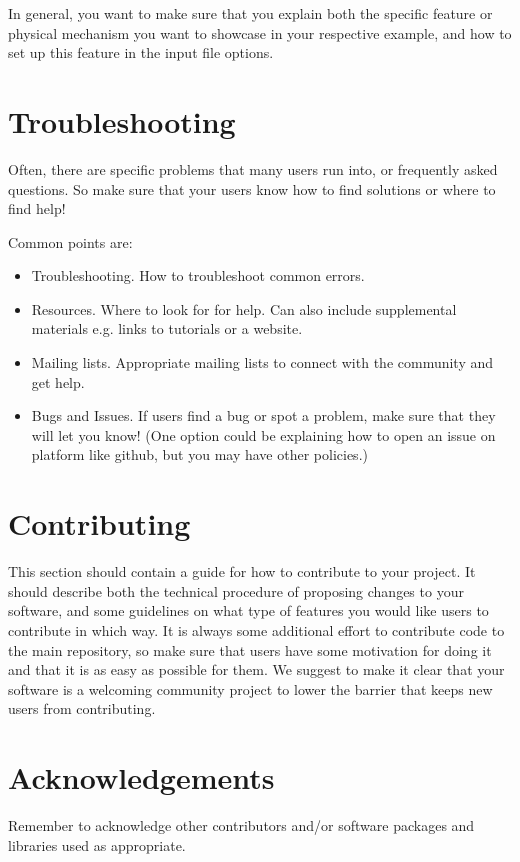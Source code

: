 \documentclass{article}
\begin{document}
In general, you want to make sure that you explain both the specific feature or physical mechanism you want to showcase in your respective example, and how to set up this feature in the input file options. 

\section{Troubleshooting}

Often, there are specific problems that many users run into, or frequently asked questions. So make sure that your users know how to find solutions or where to find help!

Common points are:
\begin{itemize}
\item Troubleshooting. How to troubleshoot common errors.
\item Resources. Where to look for for help. Can also include supplemental materials e.g. links to tutorials or a website.
\item Mailing lists. Appropriate mailing lists to connect with the community and get help.
\item Bugs and Issues. If users find a bug or spot a problem, make sure that they will let you know! (One option could be explaining how to open an issue on  platform like github, but you may have other policies.)
\end{itemize}

\section{Contributing}

This section should contain a guide for how to contribute to your project. It should describe both the technical procedure of proposing changes to your software, and some guidelines on what type of features you would like users to contribute in which way. 
It is always some additional effort to contribute code to the main repository, so make sure that users have some motivation for doing it and that it is as easy as possible for them. We suggest to make it clear that your software is a welcoming community project to lower the barrier that keeps new users from contributing. 

\section{Acknowledgements}
Remember to acknowledge other contributors and/or software packages and libraries used as appropriate.
\end{document}
